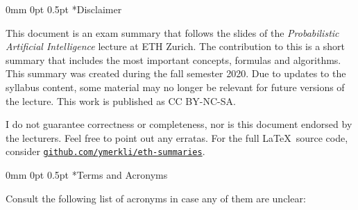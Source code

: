 \documentclass[11pt,landscape,a4paper,fleqn]{article}
\makeatletter
\renewcommand{\section}{\@startsection{section}{1}%
								{0mm}%
                                {0pt}%
                                {0.5pt}%
                                {\color{myorange}\sffamily\small\bfseries}}
\makeatother
\begin{document}
\small
\begin{multicols*}{4}
	
\section*{Disclaimer}
	
This document is an exam summary that follows the slides of the \textit{Probabilistic Artificial Intelligence} lecture  at ETH Zurich. The contribution to this is a short summary that includes the most important concepts, formulas and algorithms. This summary was created during the fall semester 2020. Due to updates to the syllabus content, some material may no longer be relevant for future versions of the lecture. This work is published as CC BY-NC-SA.

\begin{center}
	\ccbyncsa
\end{center}

I do not guarantee correctness or completeness, nor is this document endorsed by the lecturers. Feel free to point out any erratas. For the full \LaTeX \ source code, consider \texttt{\href{https://github.com/ymerkli/eth-summaries}{github.com/ymerkli/eth-summaries}}.

\vspace*{140mm}

\columnbreak

\section*{Terms and Acronyms}

Consult the following list of acronyms in case any of them are unclear:\\


\end{multicols*}
\end{document}
